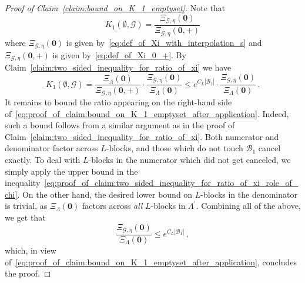 \documentclass[11pt]{article}
\theoremstyle{definition}
\theoremstyle{remark}
\numberwithin{theorem}{section}
\def\La{{\Lambda}}
\begin{document}
    \begin{proof}[Proof of Claim~\ref{claim:bound_on_K_1_emptyset}]
        Note that
        \[
        K_1(\emptyset,\mathcal{G}) = \frac{\Xi_{\mathcal{G},\eta}(\mathbf{0})}{\Xi_{\mathcal{G},\eta}(\mathbf{0},+)} 
        \]
        where $\Xi_{\mathcal{G},\eta}(\mathbf{0})$ is given by~\eqref{eq:def_of_Xi_with_interpolation_s} and $\Xi_{\mathcal{G},\eta}(\mathbf{0},+)$ is given by~\eqref{eq:def_of_Xi_0_+}. By Claim~\ref{claim:two_sided_inequality_for_ratio_of_xi} we have 
        \begin{equation} \label{eq:proof_of_claim:bound_on_K_1_emptyset_after_application}
             K_1(\emptyset,\mathcal{G}) = \frac{\Xi_{\La}(\mathbf{0})}{\Xi_{\mathcal{G},\eta}(\mathbf{0},+)} \cdot \frac{\Xi_{\mathcal{G},\eta}(\mathbf{0})}{\Xi_{\La}(\mathbf{0})} \le e^{C_L|\mathcal{B}_1|} \cdot \frac{\Xi_{\mathcal{G},\eta}(\mathbf{0})}{\Xi_{\La}(\mathbf{0})} \, .
        \end{equation}
        It remains to bound the ratio appearing on the right-hand side of~\eqref{eq:proof_of_claim:bound_on_K_1_emptyset_after_application}. Indeed, such a bound follows from a similar argument as in the proof of Claim~\ref{claim:two_sided_inequality_for_ratio_of_xi}. Both numerator and denominator factor across $L$-blocks, and those which do not touch $\mathcal{B}_1$ cancel exactly. To deal with $L$-blocks in the numerator which did not get canceled, we simply apply the upper bound in the inequality~\eqref{eq:proof_of_claim:two_sided_inequality_for_ratio_of_xi_role_of_chi}. On the other hand, the desired lower bound on $L$-blocks in the denominator is trivial, as $\Xi_{\La}(\mathbf{0})$ factors across \emph{all} $L$-blocks in $\La^\prime$. Combining all of the above, we get that
        \[
        \frac{\Xi_{\mathcal{G},\eta}(\mathbf{0})}{\Xi_{\La}(\mathbf{0})}  \le e^{C_L |\mathcal{B}_1|} \, ,
        \]
        which, in view of~\eqref{eq:proof_of_claim:bound_on_K_1_emptyset_after_application}, concludes the proof.
    \end{proof}
\end{document}
